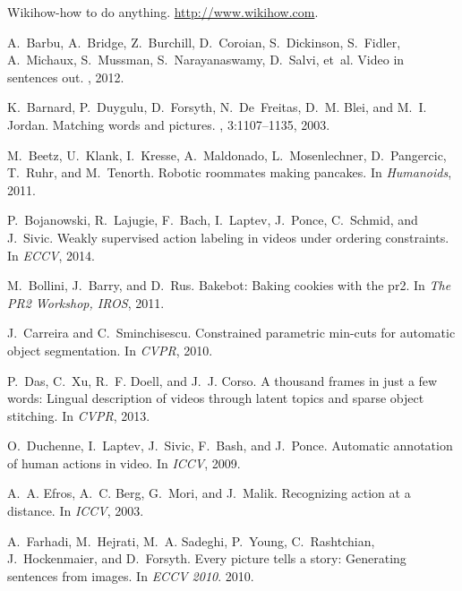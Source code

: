\documentclass[10pt,twocolumn,letterpaper]{article}
\begin{document}
%
%

\begin{thebibliography}{10}\itemsep=-1pt

Wikihow-how to do anything.
\newblock \url{http://www.wikihow.com}.

A.~Barbu, A.~Bridge, Z.~Burchill, D.~Coroian, S.~Dickinson, S.~Fidler,
  A.~Michaux, S.~Mussman, S.~Narayanaswamy, D.~Salvi, et~al.
\newblock Video in sentences out.
, 2012.

K.~Barnard, P.~Duygulu, D.~Forsyth, N.~De~Freitas, D.~M. Blei, and M.~I.
  Jordan.
\newblock Matching words and pictures.
, 3:1107--1135, 2003.

M.~Beetz, U.~Klank, I.~Kresse, A.~Maldonado, L.~Mosenlechner, D.~Pangercic,
  T.~Ruhr, and M.~Tenorth.
\newblock Robotic roommates making pancakes.
\newblock In {\em Humanoids}, 2011.

P.~Bojanowski, R.~Lajugie, F.~Bach, I.~Laptev, J.~Ponce, C.~Schmid, and
  J.~Sivic.
\newblock Weakly supervised action labeling in videos under ordering
  constraints.
\newblock In {\em ECCV}, 2014.

M.~Bollini, J.~Barry, and D.~Rus.
\newblock Bakebot: Baking cookies with the pr2.
\newblock In {\em The PR2 Workshop, IROS}, 2011.

J.~Carreira and C.~Sminchisescu.
\newblock Constrained parametric min-cuts for automatic object segmentation.
\newblock In {\em CVPR}, 2010.

P.~Das, C.~Xu, R.~F. Doell, and J.~J. Corso.
\newblock A thousand frames in just a few words: Lingual description of videos
  through latent topics and sparse object stitching.
\newblock In {\em CVPR}, 2013.

O.~Duchenne, I.~Laptev, J.~Sivic, F.~Bash, and J.~Ponce.
\newblock Automatic annotation of human actions in video.
\newblock In {\em ICCV}, 2009.

A.~A. Efros, A.~C. Berg, G.~Mori, and J.~Malik.
\newblock Recognizing action at a distance.
\newblock In {\em ICCV}, 2003.

A.~Farhadi, M.~Hejrati, M.~A. Sadeghi, P.~Young, C.~Rashtchian, J.~Hockenmaier,
  and D.~Forsyth.
\newblock Every picture tells a story: Generating sentences from images.
\newblock In {\em ECCV 2010}. 2010.


\end{thebibliography}
\end{document}
